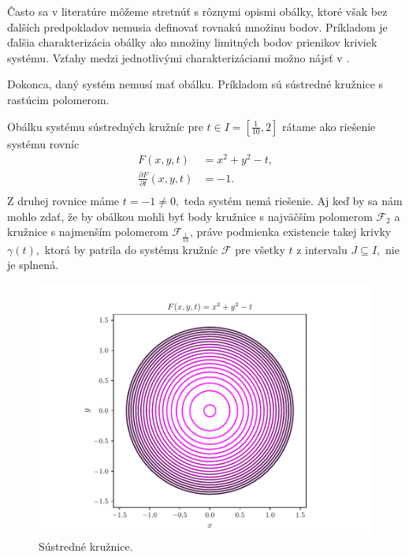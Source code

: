 Často sa v literatúre môžeme stretnúť s rôznymi opismi obálky, ktoré však bez ďalších predpokladov nemusia definovať rovnakú množinu bodov. Príkladom je ďalšia charakterizácia obálky ako množiny limitných bodov prienikov kriviek systému. Vzťahy medzi jednotlivými charakterizáciami možno nájsť v \cite{Bru81}.  

Dokonca, daný systém nemusí mať obálku. Príkladom sú sústredné kružnice s rastúcim polomerom.

\begin{example} 
Obálku systému sústredných kružníc pre $t \in I=[\frac{1}{10},2]$ rátame ako riešenie systému rovníc
\begin{align*}
F(x, y, t) &= x^2 + y^2 - t, \\
\frac{\partial F}{\partial t}(x,y,t) &= -1. \\
\end{align*}
Z druhej rovnice máme $t=-1 \neq 0,$ teda systém nemá riešenie. Aj keď by sa nám mohlo zdať, že by obálkou mohli byť body kružnice s najväčším polomerom $\mathcal{F}_2$ a kružnice s najmenším polomerom $\mathcal{F}_{\frac{1}{10}}$, práve podmienka existencie takej krivky $\gamma(t),$ ktorá by patrila do systému kružníc $\mathcal{F}$ pre všetky $t$ z intervalu $J \subseteq  I, $ nie je splnená.
\end{example}

\begin{figure}[h]
	\centering
	\includegraphics[trim={0 0.35cm 0 0.85cm},clip]{images/concentric_circles.pdf}
	\caption{Sústredné kružnice.}
	\label{fig:concentric_circles}
\end{figure}

